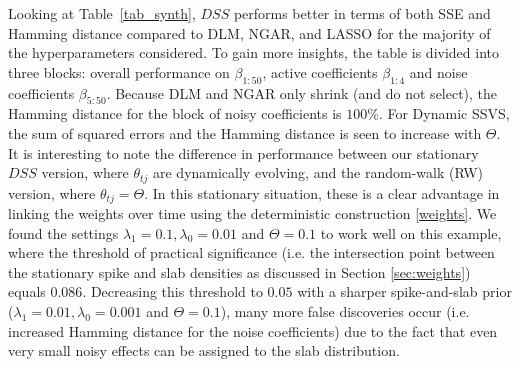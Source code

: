 \documentclass[ba]{imsart}
\numberwithin{equation}{section}
\theoremstyle{plain}
\begin{document}
{Looking at Table~\ref{tab_synth}, $DSS$ performs better in terms of both SSE and Hamming distance compared to DLM, NGAR, and LASSO for the majority of the hyperparameters considered. To gain more insights, the table is divided into three blocks: overall performance on $\beta_{1:50}$, active coefficients $\beta_{1:4}$ and noise coefficients $\beta_{5:50}$.
Because DLM and NGAR only shrink (and do not select), the Hamming distance for the block of noisy coefficients is $100\%$. 
For Dynamic SSVS, the sum of squared errors and the Hamming distance is seen to increase with $\Theta$.  It is interesting to note the difference in performance between our stationary $DSS$ version, where $\theta_{tj}$ are dynamically evolving, and the random-walk (RW) version, where $\theta_{tj}=\Theta$.  In this stationary situation, these is a clear advantage in linking the weights over time using the deterministic construction \eqref{weights}.
We found the settings $\lambda_1=0.1,\lambda_0=0.01$ and $\Theta=0.1$ to work well on this example, where the threshold of practical significance (i.e. the intersection point between the stationary spike and slab densities as discussed in Section \ref{sec:weights}) equals $0.086$.  Decreasing this threshold to $0.05$ with a sharper spike-and-slab prior ($\lambda_1=0.01,\lambda_0=0.001$ and $\Theta=0.1$), many more false discoveries  occur (i.e. increased Hamming distance for the noise coefficients) due to the fact that even very small noisy effects can be assigned to the slab distribution. 



}
\end{document}
